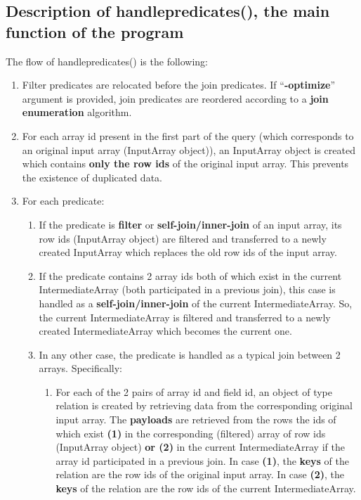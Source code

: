 \documentclass{ws-ijprai}
\begin{document}
\subsection{Description of handlepredicates(), the main function of the program}
The flow of handlepredicates() is the following:
\begin{enumerate}
    \item Filter predicates are relocated before the join predicates. If “\textbf{-optimize}” argument is provided, join predicates are reordered according to a \textbf{join enumeration} algorithm.
    \item For each array id present in the first part of the query (which corresponds to an original input array (InputArray object)), an InputArray object is created which contains \textbf{only the row ids} of the original input array. This prevents the existence of duplicated data.
    \item For each predicate:
    \begin{enumerate}
        \item If the predicate is \textbf{filter} or \textbf{self-join/inner-join} of an input array, its row ids (InputArray object) are filtered and transferred to a newly created InputArray which replaces the old row ids of the input array.
        \item If the predicate contains 2 array ids both of which exist in the current IntermediateArray (both participated in a previous join), this case is handled as a \textbf{self-join/inner-join} of the current IntermediateArray. So, the current IntermediateArray is filtered and transferred to a newly created IntermediateArray which becomes the current one.
        \item In any other case, the predicate is handled as a typical join between 2 arrays. Specifically:
        \begin{enumerate}
            \item For each of the 2 pairs of array id and field id, an object of type relation is created by retrieving data from the corresponding original input array. The \textbf{payloads} are retrieved from the rows the ids of which exist \textbf{(1)} in the corresponding (filtered) array of row ids (InputArray object) \textbf{or (2)} in the current IntermediateArray if the array id participated in a previous join. In case \textbf{(1)}, the \textbf{keys} of the relation are the row ids of the original input array. In case \textbf{(2)}, the \textbf{keys} of the relation are the row ids of the current IntermediateArray.

\end{enumerate}
\end{enumerate}
\end{enumerate}
\end{document}
